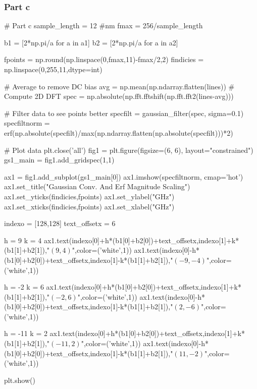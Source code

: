 \subsubsection*{Part c}
\begin{python}
# Part c
sample_length = 12 #nm
fmax = 256/sample_length

b1 = [2*np.pi/a for a in a1]
b2 = [2*np.pi/a for a in a2]

fpoints = np.round(np.linspace(0,fmax,11)-fmax/2,2)
findicies = np.linspace(0,255,11,dtype=int)

# Average to remove DC bias
avg = np.mean(np.ndarray.flatten(lines))
# Compute 2D DFT
spec = np.absolute(np.fft.fftshift(np.fft.fft2(lines-avg)))

# Filter data to see points better
specfilt = gaussian_filter(spec, sigma=0.1)
specfiltnorm = erf(np.absolute(specfilt)/max(np.ndarray.flatten(np.absolute(specfilt)))*2)

# Plot data
plt.close('all')
fig1 = plt.figure(figsize=(6, 6), layout="constrained")
gs1_main = fig1.add_gridspec(1,1)

ax1 = fig1.add_subplot(gs1_main[0])
ax1.imshow(specfiltnorm, cmap='hot')
ax1.set_title("Gaussian Conv. And Erf Magnitude Scaling")
ax1.set_yticks(findicies,fpoints)
ax1.set_ylabel("GHz")
ax1.set_xticks(findicies,fpoints)
ax1.set_xlabel("GHz")

indexo = [128,128]
text_offsetx = 6

h = 9
k = 4
ax1.text(indexo[0]+h*(b1[0]+b2[0])+text_offsetx,indexo[1]+k*(b1[1]+b2[1]),"$(9,4)$",color=('white',1))
ax1.text(indexo[0]-h*(b1[0]+b2[0])+text_offsetx,indexo[1]-k*(b1[1]+b2[1]),"$(-9,-4)$",color=('white',1))

h = -2
k = 6
ax1.text(indexo[0]+h*(b1[0]+b2[0])+text_offsetx,indexo[1]+k*(b1[1]+b2[1]),"$(-2,6)$",color=('white',1))
ax1.text(indexo[0]-h*(b1[0]+b2[0])+text_offsetx,indexo[1]-k*(b1[1]+b2[1]),"$(2,-6)$",color=('white',1))

h = -11
k = 2
ax1.text(indexo[0]+h*(b1[0]+b2[0])+text_offsetx,indexo[1]+k*(b1[1]+b2[1]),"$(-11,2)$",color=('white',1))
ax1.text(indexo[0]-h*(b1[0]+b2[0])+text_offsetx,indexo[1]-k*(b1[1]+b2[1]),"$(11,-2)$",color=('white',1))

plt.show()
\end{python}